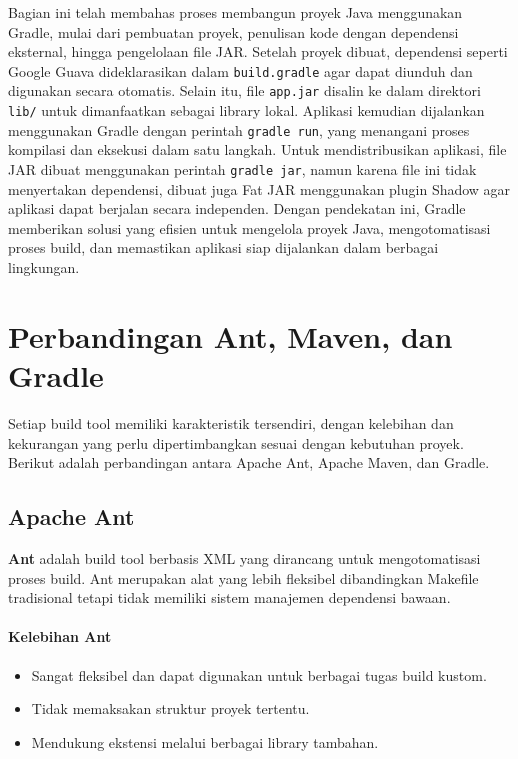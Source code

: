 Bagian ini telah membahas proses membangun proyek Java menggunakan Gradle, mulai dari pembuatan proyek, penulisan kode dengan dependensi eksternal, hingga pengelolaan file JAR. Setelah proyek dibuat, dependensi seperti Google Guava dideklarasikan dalam \texttt{build.gradle} agar dapat diunduh dan digunakan secara otomatis. Selain itu, file \texttt{app.jar} disalin ke dalam direktori \texttt{lib/} untuk dimanfaatkan sebagai library lokal. Aplikasi kemudian dijalankan menggunakan Gradle dengan perintah \texttt{gradle run}, yang menangani proses kompilasi dan eksekusi dalam satu langkah. Untuk mendistribusikan aplikasi, file JAR dibuat menggunakan perintah \texttt{gradle jar}, namun karena file ini tidak menyertakan dependensi, dibuat juga Fat JAR menggunakan plugin Shadow agar aplikasi dapat berjalan secara independen. Dengan pendekatan ini, Gradle memberikan solusi yang efisien untuk mengelola proyek Java, mengotomatisasi proses build, dan memastikan aplikasi siap dijalankan dalam berbagai lingkungan.




\section{Perbandingan Ant, Maven, dan Gradle}
Setiap build tool memiliki karakteristik tersendiri, dengan kelebihan dan kekurangan yang perlu dipertimbangkan sesuai dengan kebutuhan proyek. Berikut adalah perbandingan antara Apache Ant, Apache Maven, dan Gradle.

\subsection{Apache Ant}
\textbf{Ant} adalah build tool berbasis XML yang dirancang untuk mengotomatisasi proses build. Ant merupakan alat yang lebih fleksibel dibandingkan Makefile tradisional tetapi tidak memiliki sistem manajemen dependensi bawaan.

\paragraph{Kelebihan Ant}
\begin{itemize}
	\item Sangat fleksibel dan dapat digunakan untuk berbagai tugas build kustom.
	\item Tidak memaksakan struktur proyek tertentu.
	\item Mendukung ekstensi melalui berbagai library tambahan.
\end{itemize}


